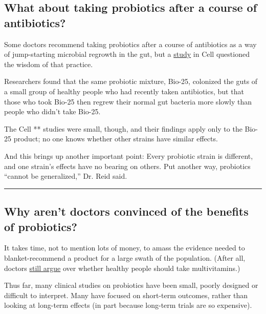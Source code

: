 \hypertarget{what-about-taking-probiotics-after-a-course-of-antibiotics}{%
\subsection{What about taking probiotics after a course of
antibiotics?}\label{what-about-taking-probiotics-after-a-course-of-antibiotics}}

Some doctors recommend taking probiotics after a course of antibiotics
as a way of jump-starting microbial regrowth in the gut, but a
\href{https://linkinghub.elsevier.com/retrieve/pii/S0092-8674(18)31108-5}{study}
in Cell questioned the wisdom of that practice.

Researchers found that the same probiotic mixture, Bio-25, colonized the
guts of a small group of healthy people who had recently taken
antibiotics, but that those who took Bio-25 then regrew their normal gut
bacteria more slowly than people who didn't take Bio-25.

The Cell ** studies were small, though, and their findings apply only to
the Bio-25 product; no one knows whether other strains have similar
effects.

And this brings up another important point: Every probiotic strain is
different, and one strain's effects have no bearing on others. Put
another way, probiotics ``cannot be generalized,'' Dr. Reid said.

\begin{center}\rule{0.5\linewidth}{\linethickness}\end{center}

\hypertarget{why-arent-doctors-convinced-of-the-benefits-of-probiotics}{%
\subsection{Why aren't doctors convinced of the benefits of
probiotics?}\label{why-arent-doctors-convinced-of-the-benefits-of-probiotics}}

It takes time, not to mention lots of money, to amass the evidence
needed to blanket-recommend a product for a large swath of the
population. (After all, doctors
\href{https://annals.org/aim/fullarticle/1789253/enough-enough-stop-wasting-money-vitamin-mineral-supplements}{still
argue} over whether healthy people should take multivitamins.)

Thus far, many clinical studies on probiotics have been small, poorly
designed or difficult to interpret. Many have focused on short-term
outcomes, rather than looking at long-term effects (in part because
long-term trials are so expensive).

